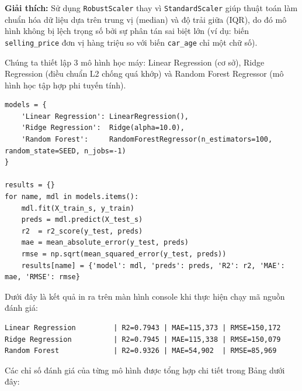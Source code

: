 \textbf{Giải thích:} Sử dụng \texttt{RobustScaler} thay vì \texttt{StandardScaler} giúp thuật toán làm chuẩn hóa dữ liệu dựa trên trung vị (median) và độ trải giữa (IQR), do đó mô hình không bị lệch trọng số bởi sự phân tán sai biệt lớn (ví dụ: biến \texttt{selling\_price} đơn vị hàng triệu so với biến \texttt{car\_age} chỉ một chữ số).

Chúng ta thiết lập 3 mô hình học máy: Linear Regression (cơ sở), Ridge Regression (điều chuẩn L2 chống quá khớp) và Random Forest Regressor (mô hình học tập hợp phi tuyến tính).

\begin{lstlisting}[style=pythoncode, caption={Huấn luyện đa mô hình học máy}]
models = {
    'Linear Regression': LinearRegression(),
    'Ridge Regression':  Ridge(alpha=10.0),
    'Random Forest':     RandomForestRegressor(n_estimators=100, random_state=SEED, n_jobs=-1)
}

results = {}
for name, mdl in models.items():
    mdl.fit(X_train_s, y_train)
    preds = mdl.predict(X_test_s)
    r2  = r2_score(y_test, preds)
    mae = mean_absolute_error(y_test, preds)
    rmse = np.sqrt(mean_squared_error(y_test, preds))
    results[name] = {'model': mdl, 'preds': preds, 'R2': r2, 'MAE': mae, 'RMSE': rmse}
\end{lstlisting}

Dưới đây là kết quả in ra trên màn hình console khi thực hiện chạy mã nguồn đánh giá:

\begin{lstlisting}[style=consoleoutput, caption={Kết quả chạy huấn luyện và đánh giá mô hình từ Notebook}]
Linear Regression         | R2=0.7943 | MAE=115,373 | RMSE=150,172
Ridge Regression          | R2=0.7945 | MAE=115,338 | RMSE=150,079
Random Forest             | R2=0.9326 | MAE=54,902  | RMSE=85,969
\end{lstlisting}

Các chỉ số đánh giá của từng mô hình được tổng hợp chi tiết trong Bảng dưới đây:

\begin{table}[H]
    \centering
    \caption{Bảng so sánh hiệu năng các mô hình dự báo giá xe cũ}
    \label{tab:used_car_model_benchmark}
\end{table}

